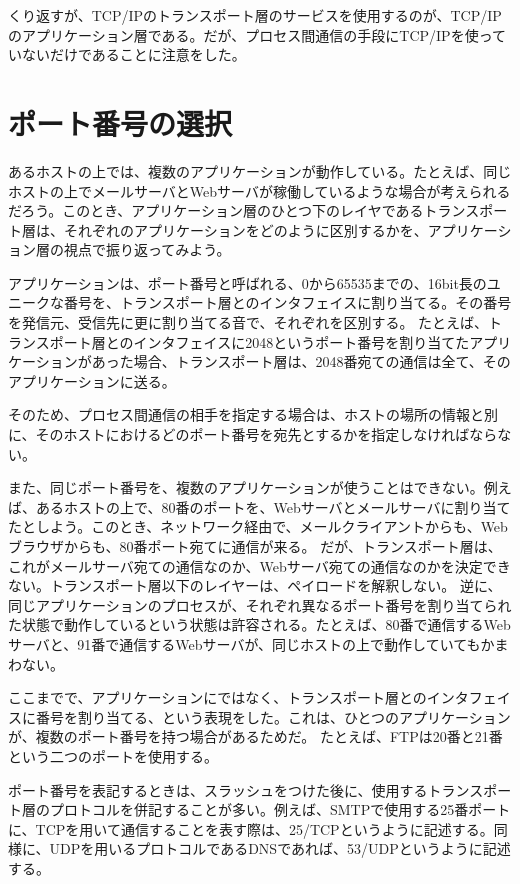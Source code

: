 くり返すが、TCP/IPのトランスポート層のサービスを使用するのが、TCP/IPのアプリケーション層である。だが、プロセス間通信の手段にTCP/IPを使っていないだけであることに注意をした。


\section{ポート番号の選択}
あるホストの上では、複数のアプリケーションが動作している。たとえば、同じホストの上でメールサーバとWebサーバが稼働しているような場合が考えられるだろう。このとき、アプリケーション層のひとつ下のレイヤであるトランスポート層は、それぞれのアプリケーションをどのように区別するかを、アプリケーション層の視点で振り返ってみよう。

アプリケーションは、ポート番号と呼ばれる、0から65535までの、16bit長のユニークな番号を、トランスポート層とのインタフェイスに割り当てる。その番号を発信元、受信先に更に割り当てる音で、それぞれを区別する。
たとえば、トランスポート層とのインタフェイスに2048というポート番号を割り当てたアプリケーションがあった場合、トランスポート層は、2048番宛ての通信は全て、そのアプリケーションに送る。

そのため、プロセス間通信の相手を指定する場合は、ホストの場所の情報と別に、そのホストにおけるどのポート番号を宛先とするかを指定しなければならない。

また、同じポート番号を、複数のアプリケーションが使うことはできない。例えば、あるホストの上で、80番のポートを、Webサーバとメールサーバに割り当てたとしよう。このとき、ネットワーク経由で、メールクライアントからも、Webブラウザからも、80番ポート宛てに通信が来る。
だが、トランスポート層は、これがメールサーバ宛ての通信なのか、Webサーバ宛ての通信なのかを決定できない。トランスポート層以下のレイヤーは、ペイロードを解釈しない。
逆に、同じアプリケーションのプロセスが、それぞれ異なるポート番号を割り当てられた状態で動作しているという状態は許容される。たとえば、80番で通信するWebサーバと、91番で通信するWebサーバが、同じホストの上で動作していてもかまわない。

ここまでで、アプリケーションにではなく、トランスポート層とのインタフェイスに番号を割り当てる、という表現をした。これは、ひとつのアプリケーションが、複数のポート番号を持つ場合があるためだ。
たとえば、FTPは20番と21番という二つのポートを使用する。

ポート番号を表記するときは、スラッシュをつけた後に、使用するトランスポート層のプロトコルを併記することが多い。例えば、SMTPで使用する25番ポートに、TCPを用いて通信することを表す際は、25/TCPというように記述する。同様に、UDPを用いるプロトコルであるDNSであれば、53/UDPというように記述する。

